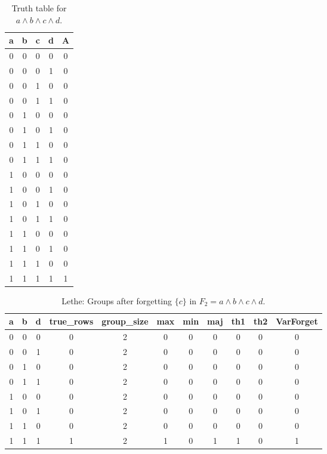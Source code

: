 \begin{table}[!tb]
    \centering
    \begin{tabular}{|c|c|c|c|c|}
        \hline
        \textbf{a} & \textbf{b} & \textbf{c} & \textbf{d} & \textbf{A} \\ \hline
        0 & 0 & 0 & 0 & 0 \\ \hline
        0 & 0 & 0 & 1 & 0 \\ \hline
        0 & 0 & 1 & 0 & 0 \\ \hline
        0 & 0 & 1 & 1 & 0 \\ \hline
        0 & 1 & 0 & 0 & 0 \\ \hline
        0 & 1 & 0 & 1 & 0 \\ \hline
        0 & 1 & 1 & 0 & 0 \\ \hline
        0 & 1 & 1 & 1 & 0 \\ \hline
        1 & 0 & 0 & 0 & 0 \\ \hline
        1 & 0 & 0 & 1 & 0 \\ \hline
        1 & 0 & 1 & 0 & 0 \\ \hline
        1 & 0 & 1 & 1 & 0 \\ \hline
        1 & 1 & 0 & 0 & 0 \\ \hline
        1 & 1 & 0 & 1 & 0 \\ \hline
        1 & 1 & 1 & 0 & 0 \\ \hline
        1 & 1 & 1 & 1 & 1 \\ \hline
    \end{tabular}
    \caption{Truth table for $a \land b \land c \land d$.}
    \label{tab:truthtab}
\end{table}

\begin{table}[!tb]
    \centering
    \begin{tabular}{|c|c|c|c|c|c|c|c|c|c|c|}
        \hline
        \textbf{a} & \textbf{b} & \textbf{d} & \textbf{true\_rows} & \textbf{group\_size} & \textbf{max} & \textbf{min} & \textbf{maj} & \textbf{th1} & \textbf{th2} & \textbf{VarForget} \\ \hline
        \rowcolor{gray!40} 0 & 0 & 0 & 0 & 2 & 0 & 0 & 0 & 0 & 0 & 0 \\ \hline
        \rowcolor{blue!40} 0 & 0 & 1 & 0 & 2 & 0 & 0 & 0 & 0 & 0 & 0 \\ \hline
        \rowcolor{red!40} 0 & 1 & 0 & 0 & 2 & 0 & 0 & 0 & 0 & 0 & 0 \\ \hline
        \rowcolor{green!40} 0 & 1 & 1 & 0 & 2 & 0 & 0 & 0 & 0 & 0 & 0 \\ \hline
        \rowcolor{yellow!40} 1 & 0 & 0 & 0 & 2 & 0 & 0 & 0 & 0 & 0 & 0 \\ \hline
        \rowcolor{gray!40} 1 & 0 & 1 & 0 & 2 & 0 & 0 & 0 & 0 & 0 & 0 \\ \hline
        \rowcolor{blue!40} 1 & 1 & 0 & 0 & 2 & 0 & 0 & 0 & 0 & 0 & 0 \\ \hline
        \rowcolor{red!40} 1 & 1 & 1 & 1 & 2 & 1 & 0 & 1 & 1 & 0 & 1 \\ \hline
    \end{tabular}
    \caption{Lethe: Groups after forgetting $\{c\}$ in $F_{2} = a \land b \land c \land d$.}
    \label{tab:lethe-F2-c-groups}
\end{table}
